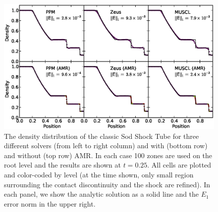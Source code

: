 \begin{figure}
\begin{center}
\includegraphics[width=\textwidth]{figures/SodShockTube.eps}
\caption{The density distribution of the classic Sod Shock Tube for
three different solvers (from left to right column) and with (bottom
row) and without (top row) AMR.  In each case 100 zones are used on
the root level and the results are shown at $t=0.25$.  All cells are
plotted and color-coded by level (at the time shown, only small region
surrounding the contact discontinuity and the shock are refined).  In
each panel, we show the analytic solution as a solid line and the $E_1$
error norm in the upper right.}
\label{fig.sodshocktube}
\end{center}
\end{figure}


